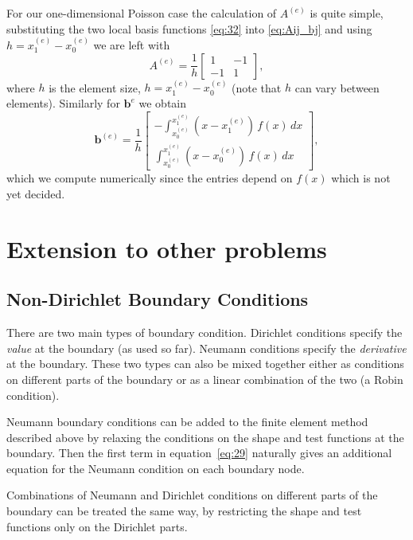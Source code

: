 For our one-dimensional Poisson case the calculation of $A^{(e)}$ is quite
simple, substituting the two local basis functions \eqref{eq:32} into
\eqref{eq:Aij_bj} and using $h=x_{1}^{(e)}-x_{0}^{(e)}$ we are left with
\begin{equation*}
  A^{(e)} = \dfrac{1}{h}
  \left[
    \begin{array}{cc}
      1 & -1 \\ -1 & 1
    \end{array}
  \right],
\end{equation*}
where $h$ is the element size, $h = x_{1}^{(e)}-x_{0}^{(e)}$ (note that $h$ can
vary between elements). Similarly for $\mathbf{b}^{{e}}$ we obtain
\begin{equation*}
  \mathbf{b}^{(e)}=\dfrac{1}{h}\left[
    \begin{array}{c}
      -\int_{x_{0}^{(e)}}^{x_{1}^{(e)}}(x-x_{1}^{(e)})\, f(x)\, dx\\
      \int_{x_{0}^{(e)}}^{x_{1}^{(e)}}(x-x_{0}^{(e)})\, f(x)\, dx
    \end{array}\right],
\end{equation*}
which we compute numerically since the entries depend on $f(x)$ which is not yet
decided.


\section{Extension to other problems}

\subsection{Non-Dirichlet Boundary Conditions}
\label{sub:Non-Dirichlet-Boundary-Conditions}

There are two main types of boundary condition. Dirichlet conditions specify the
\emph{value} at the boundary (as used so far). Neumann conditions specify the
\emph{derivative} at the boundary. These two types can also be mixed together
either as conditions on different parts of the boundary or as a linear
combination of the two (a Robin condition).

Neumann boundary conditions can be added to the finite element method described
above by relaxing the conditions on the shape and test functions at the
boundary. Then the first term in equation~\eqref{eq:29} naturally gives an
additional equation for the Neumann condition on each boundary node.

Combinations of Neumann and Dirichlet conditions on different parts of the boundary can be treated the same way, by restricting the shape and test functions only on the Dirichlet parts.


